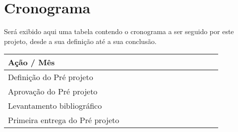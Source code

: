 \newpage
\section{Cronograma}

\par Será exibido aqui uma tabela contendo o cronograma a ser seguido por este projeto, desde a sua definição até a sua conclusão.

\begin{table}[htbp]
	\scriptsize
	\centering
	\begin{tabular}{|p{60mm}|p{3mm}|p{3mm}|p{3mm}|p{3mm}|p{3mm}|p{3mm}|p{3mm}|p{3mm}|p{3mm}|p{3mm}|p{3mm}|p{3mm}|}%
		\hline\vspace{.99cm} %
		\textbf{Ação} / \textbf{Mês} & 
		\parbox[t]{2mm}{} & \parbox[t]{2mm}{} & 
		\parbox[t]{2mm}{} & 
		\parbox[t]{2mm}{} &
		\parbox[t]{2mm}{} &
		\parbox[t]{2mm}{} &
		\parbox[t]{2mm}{} &
		\parbox[t]{2mm}{} &
		\parbox[t]{2mm}{} &
		\parbox[t]{2mm}{} &
		\parbox[t]{2mm}{} &
		\parbox[t]{2mm}{} \\
		\hline 
		Definição do Pré projeto &  &  &  &  &  &  &  &  &  &  &  & \\ \hline %
		
		Aprovação do Pré projeto &  &  &  &  &  &  &  &  &  &  &  & \\ \hline %
		
		Levantamento bibliográfico &  &  &  &  &  &  &  &  &  &  &  & \\ \hline %
		
		Primeira entrega do Pré projeto &  &  &  &  &  &  &  &  &  &  &  & \\ \hline %
		

\end{tabular}
\end{table}
